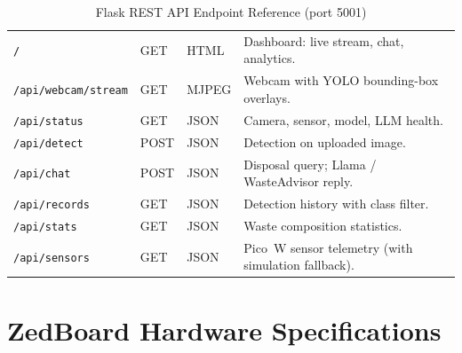 \documentclass[12pt,a4paper]{article}
\begin{document}
\renewcommand{\arraystretch}{1.30}
\begin{table}[H]
\centering
\caption{Flask REST API Endpoint Reference (port 5001)}
\label{tab:api}
\small
\begin{tabularx}{\linewidth}{@{} L{4.0cm} C{1.5cm} C{2.0cm} X @{}}
\toprule
{} &  &  &  \\
\midrule
{}
{\footnotesize\texttt{/}}                  & GET  & HTML   & Dashboard: live stream, chat, analytics. \\
{\footnotesize\texttt{/api/webcam/stream}} & GET  & MJPEG  & Webcam with YOLO bounding-box overlays. \\
{\footnotesize\texttt{/api/status}}        & GET  & JSON   & Camera, sensor, model, LLM health. \\
{\footnotesize\texttt{/api/detect}}        & POST & JSON   & Detection on uploaded image. \\
{\footnotesize\texttt{/api/chat}}          & POST & JSON   & Disposal query; Llama / WasteAdvisor reply. \\
{\footnotesize\texttt{/api/records}}       & GET  & JSON   & Detection history with class filter. \\
{\footnotesize\texttt{/api/stats}}         & GET  & JSON   & Waste composition statistics. \\
{\footnotesize\texttt{/api/sensors}}       & GET  & JSON   & Pico~W sensor telemetry (with simulation fallback). \\
\bottomrule
\end{tabularx}
\end{table}

\clearpage

\section{ZedBoard Hardware Specifications}
\end{document}
